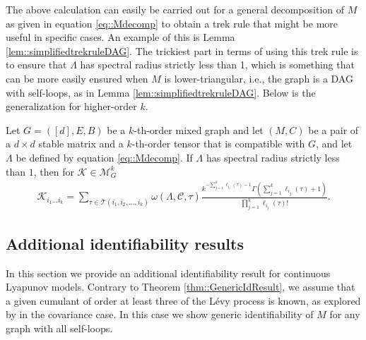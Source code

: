 \documentclass{biometrika}
\begin{document}
The above calculation can easily be carried out for a general decomposition of $M$ as given in equation \eqref{eq::Mdecomp} to obtain a trek rule that might be more useful in specific cases. An example of this is Lemma \ref{lem::simplifiedtrekruleDAG}. The trickiest part in terms of using this trek rule is to ensure that $\Lambda$ has spectral radius strictly less than 1, which is something that can be more easily ensured when $M$ is lower-triangular, i.e., the graph is a DAG with self-loops, as in Lemma \ref{lem::simplifiedtrekruleDAG}.
Below is the generalization for higher-order $k$. 
\begin{proposition}
\label{prop::LambdaTrekRuleGeneral}
  Let $G = ([d],E,B)$ be a $k$-th-order mixed graph and let $(M,C)$ be a pair of a $d\times d$ stable matrix and a $k$-th-order tensor that is compatible with $G$, 
    and let $\Lambda$ be defined by equation \eqref{eq::Mdecomp}. 
    If $\Lambda$ has spectral radius strictly less than $1$, then for $\mathcal{K}  \in \mathcal{M}^k_{G}$
    \begin{align*}
        \mathcal{K} _{i_1 \dots i_k} = \sum_{\tau \in \mathcal{T}(i_1, i_2, \dots, i_k)} \omega(\Lambda, \mathcal{C}, \tau)  \frac{k^{-\sum_{j = 1}^k \ell_{i_j}(\tau)-1}  \Gamma \left(\sum_{j = 1}^k \ell_{i_j}(\tau)+1 \right)}{ \prod_{j = 1}^{k}\ell_{i_j}(\tau)! }. 
    \end{align*}
\end{proposition}   



\subsection{Additional identifiability results}
\label{Appendix::AddtionalIDResults}
In this section we provide an additional identifiability result for continuous Lyapunov models. 
Contrary to Theorem \ref{thm::GenericIdResult}, we assume that a given cumulant of order at least three of the Lévy process is known, as explored by \cite{Dettling:2023} in the covariance case. In this case we show generic identifiability of $M$ for any graph with all self-loops. 
\end{document}
